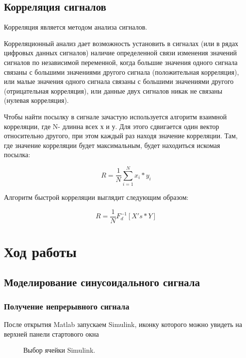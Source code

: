 \documentclass[a4paper,14pt]{extarticle}
\begin{document}
\subsection{Корреляция сигналов}

Корреляция является методом анализа сигналов.

Корреляционный анализ дает возможность установить в сигналах (или в рядах цифровых данных сигналов) наличие определенной связи изменения значений сигналов по независимой переменной, когда большие значения одного сигнала связаны с большими значениями другого сигнала (положительная корреляция), или малые значения одного сигнала связаны с большими значениями другого (отрицательная корреляция), или данные двух сигналов никак не связаны (нулевая корреляция).

Чтобы найти посылку в сигнале зачастую используется алгоритм взаимной корреляции, где N- длинна всех х и у. Для этого сдвигается один вектор относительно другого, при этом каждый раз находя значение корреляции. Там, где значение корреляции будет максимальным, будет находиться искомая посылка:

\begin{equation}
R = \frac{1}{N} \sum\limits_{i=1}^{N} x_{i}* y_{i} 
\end{equation}

Алгоритм быстрой корреляции выглядит следующим образом:

\begin{equation}
R = \frac{1}{N} F_{d}^{-1} [X's * Y] 
\end{equation}


\section{Ход работы}

\subsection{Моделирование синусоидального сигнала}

\subsubsection{Получение непрерывного сигнала}

После открытия Matlab запускаем Simulink, иконку которого можно увидеть на верхней панели стартового окна

\begin{figure}[H]
\caption{Выбор ячейки Simulink.}
\end{figure}
\end{document}
